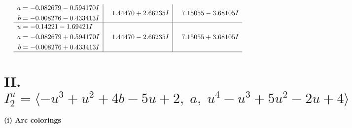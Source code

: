 \documentclass[1p]{elsarticle_modified}
\theoremstyle{definition}
\begin{document}
$$\begin{array}{c|c|c}
\begin{aligned}
a &= -0.082679 - 0.594170 I \\
b &= -0.008276 - 0.433413 I\end{aligned}
 & \phantom{-}1.44470 + 2.66235 I & \phantom{-}7.15055 - 3.68105 I \\ \hline\begin{aligned}
u &= -0.14221 - 1.69421 I \\
a &= -0.082679 + 0.594170 I \\
b &= -0.008276 + 0.433413 I\end{aligned}
 & \phantom{-}1.44470 - 2.66235 I & \phantom{-}7.15055 + 3.68105 I\\
 \hline 
 \end{array}$$\newpage\newpage\renewcommand{\arraystretch}{1}
\centering \section*{II. $I^u_{2}= \langle - u^3+u^2+4 b-5 u+2,\;a,\;u^4- u^3+5 u^2-2 u+4 \rangle$}
\flushleft \textbf{(i) Arc colorings}\\
\end{document}
